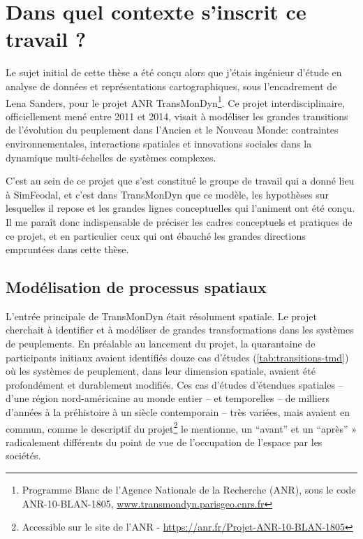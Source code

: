 \section{Dans quel contexte s'inscrit ce travail ? \label{sec:contexte}}

Le sujet initial de cette thèse a été conçu alors que j'étais ingénieur d'étude en analyse de données et représentations cartographiques, sous l'encadrement de Lena Sanders, pour le projet ANR TransMonDyn\footnote{
Programme \og Blanc\fg{} de l'Agence Nationale de la Recherche (ANR), sous le code \mbox{ANR-10-BLAN-1805},  \href{http://www.transmondyn.parisgeo.cnrs.fr/}{www.transmondyn.parisgeo.cnrs.fr}
}.
Ce projet interdisciplinaire, officiellement mené entre 2011 et 2014, visait à \og modéliser les grandes transitions de l'évolution du peuplement dans l'Ancien et le Nouveau Monde: contraintes environnementales, interactions spatiales et innovations sociales dans la dynamique multi-échelles de systèmes complexes\fg{}.

C'est au sein de ce projet que s'est constitué le groupe de travail qui a donné lieu à SimFeodal, et c'est dans TransMonDyn que ce modèle, les hypothèses sur lesquelles il repose et les grandes lignes conceptuelles qui l'animent ont été conçu.
Il me paraît donc indispensable de préciser les cadres conceptuels et pratiques de ce projet, et en particulier ceux qui ont ébauché les grandes directions empruntées dans cette thèse.

\subsection{Modélisation de processus spatiaux}

L'entrée principale de TransMonDyn était résolument spatiale.
Le projet cherchait à identifier et à modéliser de grandes transformations dans les systèmes de peuplements.
En préalable au lancement du projet, la quarantaine de participants initiaux avaient identifiés douze cas d'études (\cref{tab:transitions-tmd}) où les systèmes de peuplement, dans leur dimension spatiale, avaient été profondément et durablement modifiés.
Ces cas d'études d'étendues spatiales -- d'une région nord-américaine au monde entier -- et temporelles -- de milliers d'années à la préhistoire à un siècle contemporain -- très variées, mais avaient en commun, comme le descriptif du projet\footnote{
	Accessible sur le site de l'ANR -  \href{https://anr.fr/Projet-ANR-10-BLAN-1805}{https://anr.fr/Projet-ANR-10-BLAN-1805}
} le mentionne, \og un “avant” et un “après” » radicalement différents du point de vue de l’occupation de l’espace par les sociétés.\fg{}

